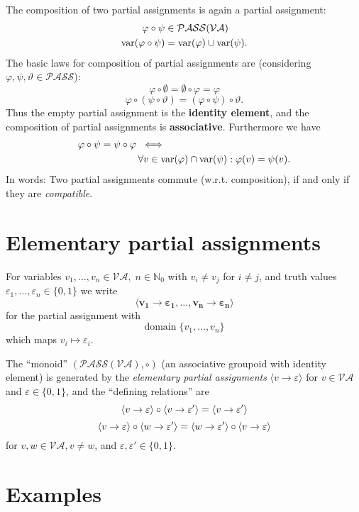 \documentclass{article}
\def\mva{{\mathcal{VA}}}
\def\mpass{{\mathcal{PASS}}}
\def\mpv{{\mpass(\mva)}}
\def\var{{\rm var}}
\begin{document}
The composition of two partial assignments is again a partial assignment:
\begin{align*}
\varphi \circ \psi & \in \mpv \\
\var(\varphi \circ \psi) & = \var(\varphi)\cup \var(\psi).
\end{align*}
The basic laws for composition of partial assignments are (considering $\varphi, \psi, \vartheta \in \mpass$):
\[
\varphi \circ \emptyset  = \emptyset \circ \varphi = \varphi
\]
\[
\varphi \circ (\psi \circ \vartheta) = (\varphi \circ \psi) \circ \vartheta .
\]
Thus the empty partial assignment is the \textbf{identity element}, and the composition of partial assignments is \textbf{associative}. Furthermore we have
\begin{align*}
\varphi \circ \psi = \psi \circ \varphi & \;\; \Longleftrightarrow \\
& \, \forall v\in \var(\varphi) \cap \var(\psi) : \varphi(v) = \psi(v).
\end{align*}
In words: Two partial assignments commute (w.r.t. composition), if and only if they are \textit{compatible}.

\section{Elementary partial assignments}

For variables $v_1, \ldots, v_n \in \mva, \; n\in \mathbb{N}_0$ with $v_i \neq v_j$ for $i\neq j$, and truth values $\varepsilon_1, \ldots, \varepsilon_n \in \{0,1\}$ we write
\[
\pmb{\langle v_1 \to \varepsilon_1, \ldots, v_n \to \varepsilon_n\rangle}
\]
for the partial assignment with
\[
\mbox{domain} \; \{v_1, \ldots, v_n\}
\]
which maps $v_i \mapsto \varepsilon_i$.

The ``monoid'' $(\mpv, \circ)$ (an associative groupoid with identity element) is generated by the \textit{elementary partial assignments} $\langle v\to \varepsilon\rangle$ for $v\in \mva$ and $\varepsilon \in \{0,1\}$, and the ``defining relations'' are
\[
\langle v\to \varepsilon \rangle \circ \langle v\to \varepsilon' \rangle = \langle v\to \varepsilon' \rangle \\
\]
\[
\langle v\to \varepsilon \rangle \circ \langle w\to \varepsilon' \rangle = \langle w\to \varepsilon' \rangle \circ \langle v\to \varepsilon \rangle\\
\]
for $v, w\in \mva, v\neq w$, and $\varepsilon, \varepsilon' \in \{0, 1\}$.

\section{Examples}
\end{document}
